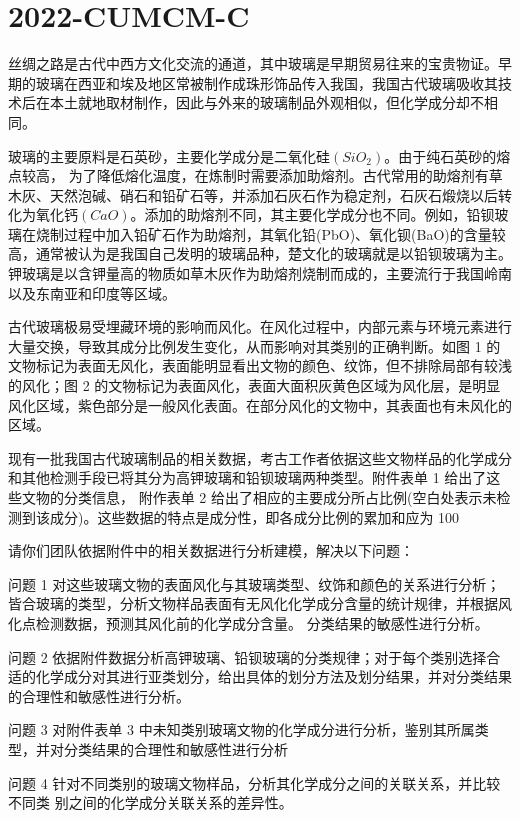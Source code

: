 \documentclass[12pt]{ctexart}
\numberwithin{equation}{section} %
\begin{document}
\section{2022-CUMCM-C}
\begin{myex}
  丝绸之路是古代中西方文化交流的通道，其中玻璃是早期贸易往来的宝贵物证。早期的玻璃在西亚和埃及地区常被制作成珠形饰品传入我国，我国古代玻璃吸收其技术后在本土就地取材制作，因此与外来的玻璃制品外观相似，但化学成分却不相同。
 
  玻璃的主要原料是石英砂，主要化学成分是二氧化硅$(SiO_2)$。由于纯石英砂的熔点较高， 为了降低熔化温度，在炼制时需要添加助熔剂。古代常用的助熔剂有草木灰、天然泡碱、硝石和铅矿石等，并添加石灰石作为稳定剂，石灰石煅烧以后转化为氧化钙$(CaO)$。添加的助熔剂不同，其主要化学成分也不同。例如，铅钡玻璃在烧制过程中加入铅矿石作为助熔剂，其氧化铅(PbO)、氧化钡(BaO)的含量较高，通常被认为是我国自己发明的玻璃品种，楚文化的玻璃就是以铅钡玻璃为主。钾玻璃是以含钾量高的物质如草木灰作为助熔剂烧制而成的，主要流行于我国岭南以及东南亚和印度等区域。
  
  古代玻璃极易受埋藏环境的影响而风化。在风化过程中，内部元素与环境元素进行大量交换，导致其成分比例发生变化，从而影响对其类别的正确判断。如图 1 的文物标记为表面无风化，表面能明显看出文物的颜色、纹饰，但不排除局部有较浅的风化；图 2 的文物标记为表面风化，表面大面积灰黄色区域为风化层，是明显风化区域，紫色部分是一般风化表面。在部分风化的文物中，其表面也有未风化的区域。

  现有一批我国古代玻璃制品的相关数据，考古工作者依据这些文物样品的化学成分和其他检测手段已将其分为高钾玻璃和铅钡玻璃两种类型。附件表单 1 给出了这些文物的分类信息， 附作表单 2 给出了相应的主要成分所占比例(空白处表示未检测到该成分)。这些数据的特点是成分性，即各成分比例的累加和应为 100%
  
  请你们团队依据附件中的相关数据进行分析建模，解决以下问题：
  
  问题 1 对这些玻璃文物的表面风化与其玻璃类型、纹饰和颜色的关系进行分析；皆合玻璃的类型，分析文物样品表面有无风化化学成分含量的统计规律，并根据风化点检测数据，预测其风化前的化学成分含量。
  分类结果的敏感性进行分析。
  
  问题 2 依据附件数据分析高钾玻璃、铅钡玻璃的分类规律；对于每个类别选择合适的化学成分对其进行亚类划分，给出具体的划分方法及划分结果，并对分类结果的合理性和敏感性进行分析。
  
  问题 3 对附件表单 3 中未知类别玻璃文物的化学成分进行分析，鉴别其所属类型，并对分类结果的合理性和敏感性进行分析
  
  问题 4 针对不同类别的玻璃文物样品，分析其化学成分之间的关联关系，并比较不同类
  别之间的化学成分关联关系的差异性。
\end{myex}
\end{document}
